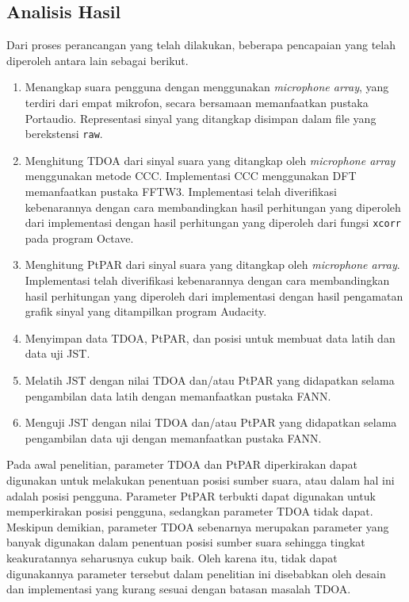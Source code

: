 
\subsection{Analisis Hasil}

Dari proses perancangan yang telah dilakukan, beberapa pencapaian yang telah diperoleh antara lain sebagai berikut.

\begin{enumerate}
\item Menangkap suara pengguna dengan menggunakan \textit{microphone array}, yang terdiri dari empat mikrofon, secara bersamaan memanfaatkan pustaka Portaudio. Representasi sinyal yang ditangkap disimpan dalam file yang berekstensi \texttt{raw}.
\item Menghitung TDOA dari sinyal suara yang ditangkap oleh \textit{microphone array} menggunakan metode CCC. Implementasi CCC menggunakan DFT memanfaatkan pustaka FFTW3. Implementasi telah diverifikasi kebenarannya dengan cara membandingkan hasil perhitungan yang diperoleh dari implementasi dengan hasil perhitungan yang diperoleh dari fungsi \texttt{xcorr} pada program Octave.
\item Menghitung PtPAR dari sinyal suara yang ditangkap oleh \textit{microphone array}. Implementasi telah diverifikasi kebenarannya dengan cara membandingkan hasil perhitungan yang diperoleh dari implementasi dengan hasil pengamatan grafik sinyal yang ditampilkan program Audacity.
\item Menyimpan data TDOA, PtPAR, dan posisi untuk membuat data latih dan data uji JST.
\item Melatih JST dengan nilai TDOA dan/atau PtPAR yang didapatkan selama pengambilan data latih dengan memanfaatkan pustaka FANN.
\item Menguji JST dengan nilai TDOA dan/atau PtPAR yang didapatkan selama pengambilan data uji dengan memanfaatkan pustaka FANN.
\end{enumerate}

Pada awal penelitian, parameter TDOA dan PtPAR diperkirakan dapat digunakan untuk melakukan penentuan posisi sumber suara, atau dalam hal ini adalah posisi pengguna. Parameter PtPAR terbukti dapat digunakan untuk memperkirakan posisi pengguna, sedangkan parameter TDOA tidak dapat. Meskipun demikian, parameter TDOA sebenarnya merupakan parameter yang banyak digunakan dalam penentuan posisi sumber suara sehingga tingkat keakuratannya seharusnya cukup baik. Oleh karena itu, tidak dapat digunakannya parameter tersebut dalam penelitian ini disebabkan oleh desain dan implementasi yang kurang sesuai dengan batasan masalah TDOA.

